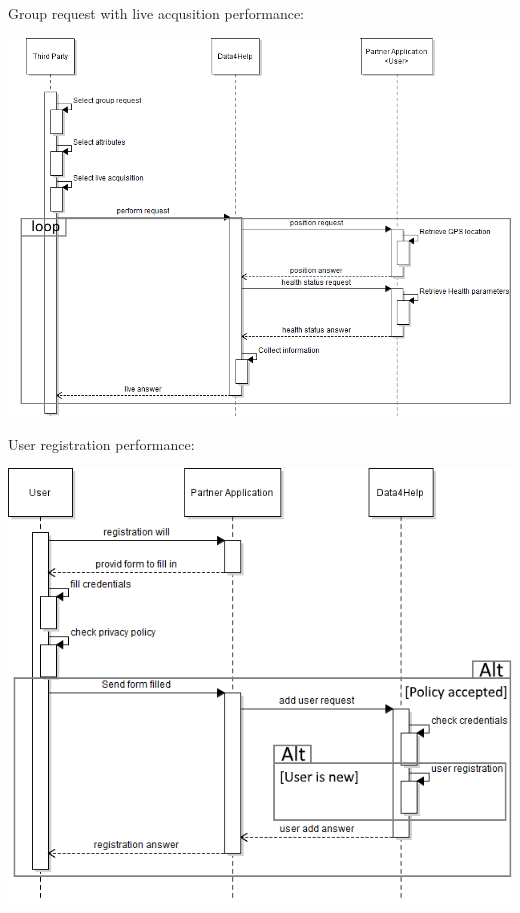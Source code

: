 \begin{enumerate}
\begin{minipage}{\textwidth}
\end{minipage}

\begin{minipage}{\textwidth}
\FloatBarrier
Group request with live acqusition performance:
\begin{center}
\includegraphics[scale=0.75]{Images/Seq_Data4Help_live.png}
\end{center}

\FloatBarrier
User registration performance:
\begin{center}
\includegraphics[scale=0.75]{Images/Seq_Data4Help_registration.png}
\end{center}



\end{minipage}
\end{enumerate}
